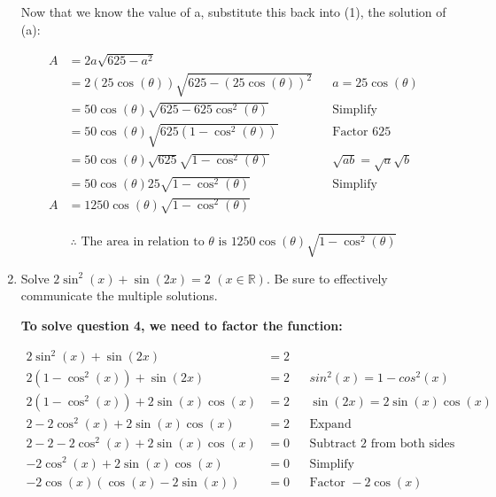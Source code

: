\documentclass[12pt]{book}
\begin{document}
\begin{enumerate}
\newpage

\begin{center}
    Now that we know the value of a, substitute this back into (1), the solution of (a):
\end{center}
\vspace{-0.5cm}

\begin{align*}
    A &= 2a\sqrt{625 - a^2} \\
    &= 2(25\cos(\theta))\sqrt{625 - (25\cos(\theta))^2} && a=25\cos(\theta)\\
    &= 50\cos(\theta)\sqrt{625 - 625\cos^2(\theta)} && \text{Simplify}\\
    &= 50\cos(\theta)\sqrt{625(1 - \cos^2(\theta))} && \text{Factor 625}\\
    &= 50\cos(\theta)\sqrt{625} \sqrt{1 - \cos^2(\theta)} && \sqrt{ab} = \sqrt{a}\sqrt{b}\\ %
    &= 50\cos(\theta)25 \sqrt{1 - \cos^2(\theta)} && \text{Simplify} \\
    A &= 1250\cos(\theta)\sqrt{1 - \cos^2(\theta)} \\
\end{align*}

\vspace{-0.5cm}
$$\boxed{\therefore \text{ The area in relation to } \theta \text{ is } 1250\cos(\theta)\sqrt{1 - \cos^2(\theta)}}$$

\newpage


\item Solve $2\sin^2(x) + \sin(2x) = 2$ $(x \in \mathbb{R})$. Be sure to effectively communicate the multiple solutions.

\textbf{To solve question 4, we need to factor the function:}

\begin{align*}
    2\sin^2(x) + \sin(2x) &= 2 \\
    2(1-\cos^2(x)) + \sin(2x) &= 2 && sin^2(x) = 1 - cos^2(x) \\
    2(1-\cos^2(x)) + 2\sin(x)\cos(x) &= 2 && \sin(2x) = 2\sin(x)\cos(x) \\
    2-2\cos^2(x) + 2\sin(x)\cos(x) &= 2 && \text{Expand}\\
    2 - 2 - 2\cos^2(x) + 2\sin(x)\cos(x) &= 0 && \text{Subtract 2 from both sides}\\
    - 2\cos^2(x) + 2\sin(x)\cos(x) &= 0 && \text{Simplify}\\
    - 2\cos(x)(\cos(x) - 2\sin(x)) &= 0 && \text{Factor } -2\cos(x)\\
\end{align*}


\end{enumerate}
\end{document}
